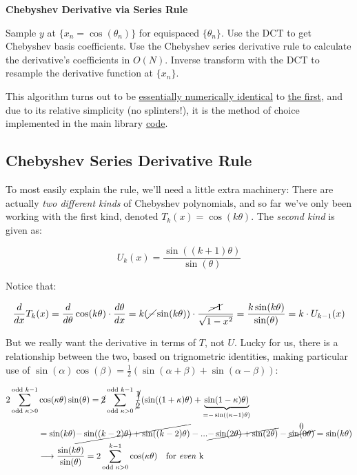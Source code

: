 \documentclass[10pt]{article}
\begin{document}
\begin{algorithm}
\caption*{\textbf{Chebyshev Derivative via Series Rule}}
\begin{algorithmic}[1] %
\STATE Sample $y$ at $\{x_n = \cos(\theta_n)\}$ for equispaced $\{\theta_n\}$.
\STATE Use the DCT to get Chebyshev basis coefficients.
\STATE Use the Chebyshev series derivative rule to calculate the derivative's coefficients in $O(N)$.
\STATE Inverse transform with the DCT to resample the derivative function at $\{x_n\}$.
\end{algorithmic}
\end{algorithm}

This algorithm turns out to be \href{https://github.com/pavelkomarov/spectral-derivatives/blob/main/notebooks/alternative_chebyshev_derivative_methods.ipynb}{essentially numerically identical} to \hyperref[algo]{the first}, and due to its relative simplicity (no splinters!), it is the method of choice implemented in the main library \href{https://github.com/pavelkomarov/spectral-derivatives/blob/main/specderiv/specderiv.py}{code}.

\subsection{Chebyshev Series Derivative Rule}

To most easily explain the rule, we'll need a little extra machinery: There are actually \textit{two different kinds} of Chebyshev polynomials, and so far we've only been working with the first kind, denoted $T_k(x) = \cos(k\theta)$. The \textit{second kind} is given as:

$$U_k(x) = \frac{\sin((k+1)\theta)}{\sin(\theta)}$$

Notice that:

$$\frac{d}{dx} T_k(x) = \frac{d}{d\theta} \cos(k\theta) \cdot \frac{d\theta}{dx} = k(\cancel{-}\sin(k\theta)) \cdot \frac{\cancel{-1}}{\sqrt{1-x^2}} = \frac{k\sin(k\theta)}{\sin(\theta)} = k \cdot U_{k-1}(x)$$

But we really want the derivative in terms of $T$, not $U$. Lucky for us, there is a relationship between the two, based on trignometric identities, making particular use of $\sin(\alpha)\cos(\beta) = \frac{1}{2}(\sin(\alpha + \beta) + \sin(\alpha - \beta))$:

\begin{align*}
2\sum_{\text{odd }\kappa>0}^{\text{odd }k-1} &\cos(\kappa\theta)\sin(\theta) = \cancel{2}\sum_{\text{odd } \kappa>0}^{\text{odd }k-1} \cancel{\frac{1}{2}}(\sin((1+\kappa)\theta) + \underbrace{\sin(1-\kappa)\theta)}_{=-\sin((\kappa-1)\theta)}\\
&= \sin(k\theta) \cancel{-\sin((k-2)\theta) + \sin((k-2)\theta)} - ... \cancel{-\sin(2\theta) + \sin(2\theta)} - \overset{\text{\normalsize 0}}{\cancel{\sin(0\theta)}} = \sin(k\theta)\\
&\longrightarrow \frac{\sin(k\theta)}{\sin(\theta)} = 2\sum_{\text{odd }\kappa>0}^{k-1} \cos(\kappa\theta) \quad \text{for \textit{even} k}
\end{align*}
\end{document}
